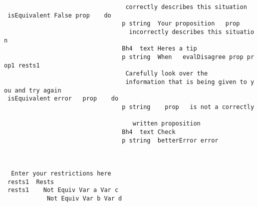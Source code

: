 \documentclass{article}
\begin{document}
\begin{tabbing}
\tt ~~~~~~~~~~~~~~~~~~~~~~~~~~~~~~~~~~correctly~describes~this~situation\\
\tt ~isEquivalent~False~prop~~~~do\\
\tt ~~~~~~~~~~~~~~~~~~~~~~~~~~~~~~~~~p~string~~Your~proposition~~~prop~\\
\tt ~~~~~~~~~~~~~~~~~~~~~~~~~~~~~~~~~~~incorrectly~describes~this~situation\\
\tt ~~~~~~~~~~~~~~~~~~~~~~~~~~~~~~~~~Bh4~~text~Heres~a~tip~\\
\tt ~~~~~~~~~~~~~~~~~~~~~~~~~~~~~~~~~p~string~~When~~~evalDisagree~prop~prop1~rests1~\\
\tt ~~~~~~~~~~~~~~~~~~~~~~~~~~~~~~~~~~Carefully~look~over~the~~\\
\tt ~~~~~~~~~~~~~~~~~~~~~~~~~~~~~~~~~~information~that~is~being~given~to~you~and~try~again\\
\tt ~isEquivalent~error~~~prop~~~~do\\
\tt ~~~~~~~~~~~~~~~~~~~~~~~~~~~~~~~~~p~string~~~~prop~~~is~not~a~correctly~\\
\tt ~~~~~~~~~~~~~~~~~~~~~~~~~~~~~~~~~~~~written~proposition\\
\tt ~~~~~~~~~~~~~~~~~~~~~~~~~~~~~~~~~Bh4~~text~Check~\\
\tt ~~~~~~~~~~~~~~~~~~~~~~~~~~~~~~~~~p~string~~betterError~error\\
\tt ~\\
\tt ~~\\
\tt ~\\
\tt ~~Enter~your~restrictions~here\\
\tt ~rests1~~Rests\\
\tt ~rests1~~~~Not~Equiv~Var~a~Var~c\\
\tt ~~~~~~~~~~~~Not~Equiv~Var~b~Var~d\\

\end{tabbing}
\end{document}
